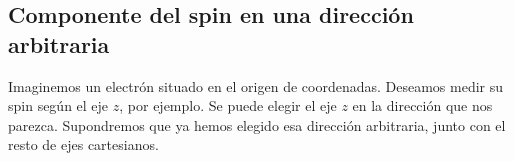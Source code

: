 \subsection{Componente del spin en una dirección arbitraria}
Imaginemos un electrón situado en el origen de coordenadas.
Deseamos medir su spin según el eje $z$, por ejemplo.
Se puede elegir el eje $z$ en la dirección que nos parezca.
Supondremos que ya hemos elegido esa dirección arbitraria, junto con el resto
de ejes cartesianos.
\begin{figure}[ht]
  \centering
  \newcommand{\colordirectrizfront}{black}
  \newcommand{\colordirectrizback}{black!50}
  \newcommand{\colormomento}{blue!85!black}
  \newcommand{\colorlinaux}{black!15}
  \newcommand{\colorndirector}{black!60}
  \newcommand{\colorelectron}{blue}
  \newcommand{\colorhelicplus}{green!60!black}
  \newcommand{\colorhelicplustext}{green!45!black}
  \newcommand{\colorhelicminus}{red!80!black}
  \newcommand{\colorhelicminustext}{red!80!black}
  \def\scl{1.2}

  \pgfmathsetmacro{\PR}{\PMOD}
  \pgfmathsetmacro{\PTHETA}{\THETA}
  \pgfmathsetmacro{\PPHI}{\PHI}
  \pgfmathsetmacro{\ACCFINTHETA}{\THETA}
  \pgfmathsetmacro{\ACCFINPHI}{\PHI}
  \tikzfading[name=fade out, inner color=transparent!0,
  outer color=transparent!100]
  

\end{figure}
